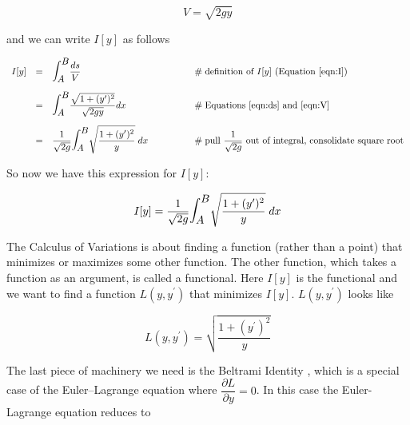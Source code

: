 \documentclass{article}
\theoremstyle{definition}
\begin{document}
\begin{equation}
V = \sqrt{2gy}
\label{eqn:V}
\end{equation}


\bigskip
\noindent
and we can write $I[y]$ as follows

\begin{equation*}
\begin{array}{lllll}
I[y]
&=& {\displaystyle \mathlarger{\mathlarger{\int_A^B}} \dfrac{ds}{V}}
									&\qquad \qquad \mathrel{\#} \text{definition of $I[y]$ (Equation \ref{eqn:I})} \\
[15pt]
&=& {\displaystyle \mathlarger{\mathlarger{\int_A^B}} \dfrac{\sqrt{1 + (y^{\prime})^2}}{\sqrt{2gy}} dx}	
									&\qquad \qquad \mathrel{\#} \text{Equations \ref{eqn:ds} and \ref{eqn:V}} \\
[15pt]

&=& {\displaystyle \dfrac{1}{\sqrt{2g}} \mathlarger{\mathlarger{\int_A^B}} \sqrt{\dfrac{1 + (y^{\prime})^2}{y}} \; dx} 
									&\qquad \qquad \mathrel{\#} \text{pull $\dfrac{1}{\sqrt{2g}}$ out of integral, consolidate square root}
\end{array}
\end{equation*}

\medskip
\bigskip
\noindent
So now we have this expression for $I[y]$:

\medskip
\bigskip
\begin{equation*}
I[y] = \dfrac{1}{\sqrt{2g}} \mathlarger{\mathlarger{\int_A^B}}  \sqrt{\dfrac{1 + (y^{\prime})^2}{y}} \; dx
\end{equation*}

\medskip
\bigskip
\noindent
The Calculus of Variations is about finding a function (rather than a point) that minimizes or
maximizes some other function. The other function, which takes a function as an argument, 
is called a functional. Here $I[y]$ is the functional and we want to find a function
$L(y,y^{\prime})$ that minimizes $I[y]$. $L(y,y^{\prime})$ looks like

\medskip
\begin{equation}
L(y,y^{\prime}) = \sqrt{\dfrac{1 + (y^{\prime})^2}{y}}
\label{eqn:L}
\end{equation}

\bigskip
\noindent
The last piece of machinery we need is the Beltrami Identity \cite{wiki:beltrami_identity},
which is a special case of the Euler–Lagrange equation where 
$\dfrac{\partial L}{\partial y} = 0$. In this case the Euler-Lagrange equation reduces
to
\end{document}
